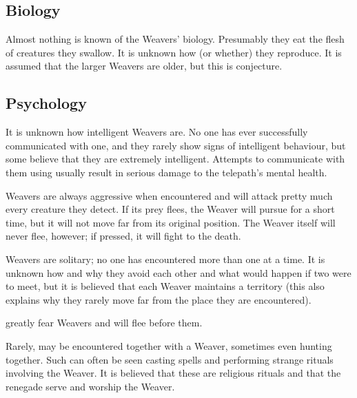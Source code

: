 \subsection{Biology}
Almost nothing is known of the Weavers' biology. Presumably they eat the flesh of creatures they swallow. It is unknown how (or whether) they reproduce. It is assumed that the larger Weavers are older, but this is conjecture. 









\subsection{Psychology}
It is unknown how intelligent Weavers are. No one has ever successfully communicated with one, and they rarely show signs of intelligent behaviour, but some believe that they are extremely intelligent. Attempts to communicate with them using  usually result in serious damage to the telepath's mental health. 

Weavers are always aggressive when encountered and will attack pretty much every creature they detect. If its prey flees, the Weaver will pursue for a short time, but it will not move far from its original position. The Weaver itself will never flee, however; if pressed, it will fight to the death. 

Weavers are solitary; no one has encountered more than one at a time. It is unknown how and why they avoid each other and what would happen if two were to meet, but it is believed that each Weaver maintains a territory (this also explains why they rarely move far from the place they are encountered). 

\Banes{} greatly fear Weavers and will flee before them. 

Rarely, \banes{} may be encountered together with a Weaver, sometimes even hunting together. Such \banes{} can often be seen casting spells and performing strange rituals involving the Weaver. It is believed that these are religious rituals and that the renegade \banes{} serve and worship the Weaver. %









